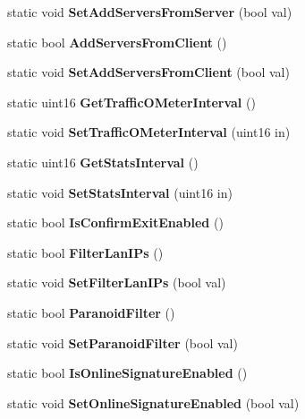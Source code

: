 \begin{DoxyCompactItemize}
\item 
static void {\bfseries SetAddServersFromServer} (bool val)\label{classCPreferences_aed233b782aed03f676ec8a8d82022164}

\item 
static bool {\bfseries AddServersFromClient} ()\label{classCPreferences_a3a675dc0eed1b9646aa7a3f2af231788}

\item 
static void {\bfseries SetAddServersFromClient} (bool val)\label{classCPreferences_a2a6cca1f8f1e5e6bc7e6a25e43a45552}

\item 
static uint16 {\bfseries GetTrafficOMeterInterval} ()\label{classCPreferences_a6f8ca392bc4dba5a66d20f52157a8f50}

\item 
static void {\bfseries SetTrafficOMeterInterval} (uint16 in)\label{classCPreferences_a830bca68184fb50cd70e4cce15635d2e}

\item 
static uint16 {\bfseries GetStatsInterval} ()\label{classCPreferences_a71e334ffc64678d8dc741fb41a611ef2}

\item 
static void {\bfseries SetStatsInterval} (uint16 in)\label{classCPreferences_a296b6e8e7fcd6c4c23e0d588f0e87fe4}

\item 
static bool {\bfseries IsConfirmExitEnabled} ()\label{classCPreferences_a9530dca053c48bd9f4d480e86e337249}

\item 
static bool {\bfseries FilterLanIPs} ()\label{classCPreferences_a7022cf71f9b8a85baefdaecfd3e9c07a}

\item 
static void {\bfseries SetFilterLanIPs} (bool val)\label{classCPreferences_a73aa541ac0ededf0618794a441684777}

\item 
static bool {\bfseries ParanoidFilter} ()\label{classCPreferences_ade4eec793c4794fc93a6942707128544}

\item 
static void {\bfseries SetParanoidFilter} (bool val)\label{classCPreferences_afcfd3c908ac95a85be47d721422af1e3}

\item 
static bool {\bfseries IsOnlineSignatureEnabled} ()\label{classCPreferences_afc0616773fa15e4b1f7e18578e3dbb47}

\item 
static void {\bfseries SetOnlineSignatureEnabled} (bool val)\label{classCPreferences_ab91a75fa8c5f9c95876fa2c3ac13088f}


\end{DoxyCompactItemize}
